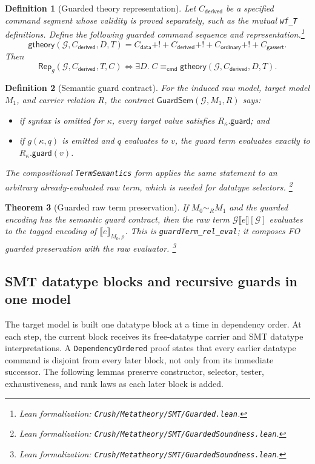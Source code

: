 \documentclass[11pt]{article}
\newtheorem{definition}{Definition}[section]
\newtheorem{theorem}[definition]{Theorem}
\theoremstyle{remark}
\newcommand{\leanfile}[1]{\footnote{Lean formalization: \texttt{Crush/Metatheory/#1}.}}
\newcommand{\den}[3]{\llbracket #1\rrbracket_{#2,#3}}
\newcommand{\guardenc}[2]{\mathcal G\llbracket #2\rrbracket[#1]}
\newcommand{\Rep}{\mathsf{Rep}}
\newcommand{\SameCmd}{\mathrel{\equiv_{\mathsf{cmd}}}}
\begin{document}
\begin{definition}[Guarded theory representation]
Let $C_{\mathsf{derived}}$ be a specified command segment whose validity is
proved separately, such as the mutual \texttt{wf\_T} definitions. Define the following guarded command
sequence and representation.\leanfile{SMT/Guarded.lean}
\[
 \mathsf{gtheory}(\mathcal G,C_{\mathsf{derived}},D,T)
 =C_{\mathsf{data}}\mathbin{+!+}C_{\mathsf{derived}}
  \mathbin{+!+}C_{\mathsf{ordinary}}\mathbin{+!+}C_{\mathsf{gassert}}.
\]
Then
\[
 \Rep_g(\mathcal G,C_{\mathsf{derived}},T,C)
 \Longleftrightarrow
 \exists D.\;C\SameCmd
  \mathsf{gtheory}(\mathcal G,C_{\mathsf{derived}},D,T).
\]
\end{definition}

\begin{definition}[Semantic guard contract]
For the induced raw model, target model $M_1$, and carrier relation $R$, the
contract $\mathsf{GuardSem}(\mathcal G,M_1,R)$ says:
\begin{itemize}[leftmargin=*]
 \item if syntax is omitted for $\kappa$, every target value satisfies
       $R_\kappa.\mathsf{guard}$; and
 \item if $g(\kappa,q)$ is emitted and $q$ evaluates to $v$, the guard term
       evaluates exactly to $R_\kappa.\mathsf{guard}(v)$.
\end{itemize}
The compositional \texttt{TermSemantics} form applies the same statement to an
arbitrary already-evaluated raw term, which is needed for datatype selectors.
\leanfile{SMT/GuardedSoundness.lean}
\end{definition}

\begin{theorem}[Guarded raw term preservation]
If $M_0\sim_R M_1$ and the guarded encoding has the semantic guard contract,
then the raw term $\guardenc{\mathcal G}{e}$ evaluates to the tagged
encoding of $\den{e}{M_0}{\rho}$. This is \texttt{guardTerm\_rel\_eval}; it
composes FO guarded preservation with the raw evaluator.
\leanfile{SMT/GuardedSoundness.lean}
\end{theorem}

\subsection{SMT datatype blocks and recursive guards in one model}

The target model is built one datatype block at a time in dependency order. At
each step, the current block receives its free-datatype carrier and SMT datatype
interpretations. A \texttt{DependencyOrdered} proof states that every earlier datatype
command is disjoint from every later block, not only from its immediate
successor. The following lemmas preserve constructor, selector, tester,
exhaustiveness, and rank laws as each later block is added.
\end{document}
